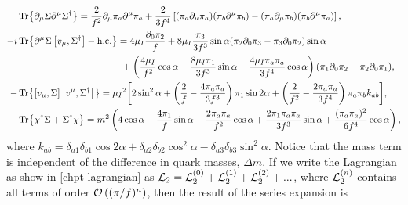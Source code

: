 \begin{align*}
    & \Tr{\partial_\mu \Sigma \partial^\mu \Sigma^\dagger}
    = \frac{2}{f^2} \partial_\mu \pi_a \partial^\mu \pi_a
    + \frac{2}{3f^4}
    \left[
        (\pi_a\partial_\mu \pi_a)(\pi_b\partial^\mu \pi_b)
        -        
        (\pi_a\partial_\mu \pi_b)(\pi_b\partial^\mu \pi_a)
    \right], \\
    -i  &\Tr{\partial^\mu\Sigma\com{v_\mu}{\Sigma^\dagger} - \hc}
    =
    4 \mu_I \frac{\partial_0\pi_2}{f}
    + 8 \mu_I \frac{\pi_3}{3f^3}\sin{\alpha}(
        \pi_2 \partial_0 \pi_3 - \pi_3 \partial_0 \pi_2
        ) \sin{\alpha}
    \\ & \quad \quad \quad \quad \quad \quad \quad \quad \quad \quad \quad
    +
    \left(
        \frac{4\mu_I}{f^2} \cos{\alpha}
        - \frac{8 \mu_I\pi_1}{3f^3} \sin{\alpha}
        - \frac{4 \mu_I \pi_a \pi_a} {3f^4}\cos{\alpha} 
    \right) 
    (\pi_1\partial_0 \pi_2 - \pi_2 \partial_0 \pi_1), \\
    - & \Tr{\com{v_\mu}{\Sigma}\com{v^\mu}{\Sigma^\dagger}}
    = \mu_I{}^2
    \bigg[
        2 \sin^2{\alpha}
        +
        \left(
            \frac{2}{f} 
            - \frac{4\pi_a \pi_a}{3 f^3} 
        \right)
        \pi_1  \sin{2\alpha}
        + \left(
            \frac{2}{f^2}
            - \frac{2 \pi_a \pi_a}{3 f^4} 
        \right)
        \pi_a \pi_b k_{ab}
    \bigg], 
    \\
    & \Tr{\chi^\dagger \Sigma + \Sigma^\dagger\chi}
    = 
    \bar m^2 
    \left(
        4 \cos{\alpha} 
        - \frac{4 \pi_1}{f} \sin{\alpha} 
        - \frac{2 \pi_a \pi_a}{f^2} \cos{\alpha}
        + \frac{2 \pi_1 \pi_a \pi_a}{3 f^3} \sin{\alpha}
        + \frac{(\pi_a \pi_a)^2}{6 f^4}\cos{\alpha}
    \right), 
    \end{align*}
where $k_{ab} =\delta_{a1} \delta_{b1} \cos{2\alpha}  + \delta_{a2}\delta_{b2}\cos^2{\alpha} - \delta_{a3}\delta_{b3} \sin^2{\alpha}$.
Notice that the mass term is independent of the difference in quark masses, $\Delta m$.
If we write the Lagrangian as show in \autoref{chpt lagrangian} as $\Ell_2 = \Ell_2^{(0)} + \Ell_2^{(1)} + \Ell_2^{(2)} +...$, where $\Ell_2^{(n)}$ contains all terms of order $\Oh[n]{(\pi/f)}$, then the result of the series expansion is
